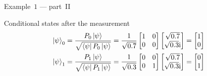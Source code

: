         \begin{frame}{Example~$1$ --- part~II}
            \begin{block}{Conditional states after the measurement}
                \begin{equation*}
                    \begin{split}
                        \ket{\psi}_0 &= \frac{P_0\ket{\psi}}{\sqrt{\bra{\psi}P_0\ket{\psi}}}
                        = \frac{1}{\sqrt{0.7}}
                        \begin{bmatrix}
                            1 & 0\\
                            0 & 0
                        \end{bmatrix}
                        \begin{bmatrix}
                            \sqrt{0.7} \\
                            \sqrt{0.3}\mathrm{i}
                        \end{bmatrix}=
                        \begin{bmatrix}
                            1 \\
                            0
                        \end{bmatrix}
                        \\
                        \ket{\psi}_1 &= \frac{P_1\ket{\psi}}{\sqrt{\bra{\psi}P_1\ket{\psi}}}
                        = \frac{1}{\sqrt{0.3}}
                        \begin{bmatrix}
                            0 & 0\\
                            0 & 1
                        \end{bmatrix}
                        \begin{bmatrix}
                            \sqrt{0.7} \\
                            \sqrt{0.3}\mathrm{i}
                        \end{bmatrix}=
                        \begin{bmatrix}
                            0 \\
                            1
                        \end{bmatrix}
                    \end{split}
                \end{equation*}
            \end{block}
        \end{frame}

